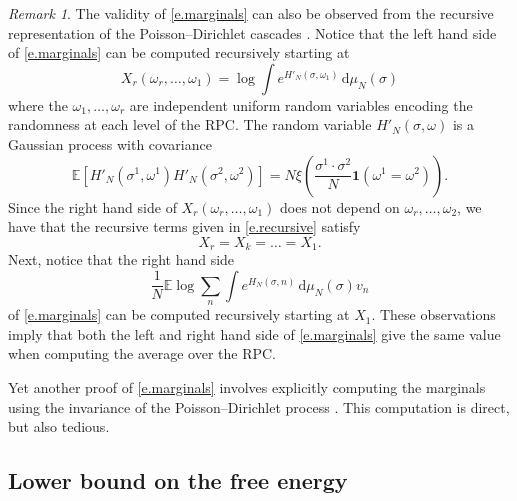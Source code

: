 \documentclass[11pt]{amsart}
\theoremstyle{remark}
\newtheorem{remark}[proposition]{Remark}
\theoremstyle{definition}
\numberwithin{equation}{section}
\numberwithin{proposition}{section}
\numberwithin{figure}{section}
\numberwithin{table}{section}
\newcommand{\E}{\mathbb{E}}
\newcommand{\Ll}{\left}
\newcommand{\Rr}{\right}
\renewcommand{\d}{\mathrm{d}}
\newcommand{\1}{\mathbf{1}}
\begin{document}
\begin{remark}
The validity of \eqref{e.marginals} can also be observed from the recursive representation of the Poisson--Dirichlet cascades \cite[Theorem~2.9]{pan}. Notice that the left hand side of \eqref{e.marginals} can be computed recursively starting at
\[
X_r(\omega_r, \dots, \omega_1) = \log \int e^{ H'_N(\sigma,\omega_1) } \, \d\mu_N(\sigma) 
\]
where the $\omega_1, \dots, \omega_r$ are independent uniform random variables encoding the randomness at each level of the RPC. The random variable $H'_N(\sigma,\omega)$ is a Gaussian process with covariance $$\E\Ll[ H'_N(\sigma^1,\omega^1) H'_N(\sigma^2,\omega^2) \Rr] =  N \xi \Ll( \frac{\sigma^1 \cdot \sigma^2}{N} \1(\omega^1 = \omega^2) \Rr) .$$ Since the right hand side of $X_r(\omega_r, \dots, \omega_1)$ does not depend on $\omega_r, \dots, \omega_2$, we have that the recursive terms given in \eqref{e.recursive} satisfy
\[
X_r = X_k = \dots = X_1.
\]
Next, notice that the right hand side
\[
\frac{1}{N} \E \log \sum_{n}  \int e^{H_N(\sigma,n) } \, \d\mu_N(\sigma) v_{n}
\]
of \eqref{e.marginals} can be computed recursively starting at $ X_1$. These observations imply that both the left and right hand side of \eqref{e.marginals} give the same value when computing the average over the RPC. 

Yet another proof of  \eqref{e.marginals} involves explicitly computing the marginals using the invariance of the Poisson--Dirichlet process \cite[Theorem~2.6]{pan}. This computation is direct, but also tedious. 
\end{remark}

\subsection{Lower bound on the free energy}
\end{document}
